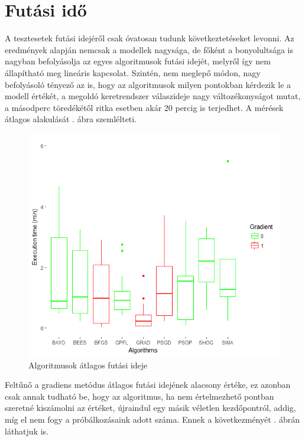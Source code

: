 \section{Futási idő}
A tesztesetek futási idejéről csak óvatosan tudunk következtetéseket levonni. Az eredmények alapján nemcsak a modellek nagysága, de főként a bonyolultsága is nagyban befolyásolja az egyes algoritmusok futási idejét, melyről így nem állapítható meg lineáris kapcsolat. Szintén, nem meglepő módon, nagy befolyásoló tényező az is, hogy az algoritmusok milyen pontokban kérdezik le a modell értékét, a megoldó keretrendszer válaszideje nagy változékonyságot mutat, a másodperc töredékétől ritka esetben akár 20 percig is terjedhet. A mérések átlagos alakulását . ábra szemlélteti.
\begin{figure}[!ht]
	\centering
	\includegraphics[width=140mm, keepaspectratio]{figures/execution_times_dobozdiagram.png}
	\caption{Algoritmusok átlagos futási ideje}
	\label{fig:exectime}
\end{figure}

Feltűnő a gradiens metódus átlagos futási idejének alacsony értéke, ez azonban csak annak tudható be, hogy az algoritmus, ha nem értelmezhető pontban szeretné kiszámolni az értéket, újraindul egy másik véletlen kezdőpontról, addig, míg el nem fogy a próbálkozásaink adott száma. Ennek a következményét . ábrán láthatjuk is.

